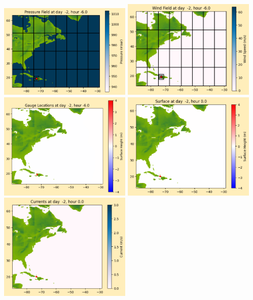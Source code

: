 \documentclass[11pt]{article}
\begin{document}
\includegraphics[width=0.475\textwidth]{frame0003fig1012.png}
\vskip 10pt 
\includegraphics[width=0.475\textwidth]{frame0003fig1013.png}
\includegraphics[width=0.475\textwidth]{frame0003fig1014.png}
\vskip 10pt 
\includegraphics[width=0.475\textwidth]{frame0004fig1001.png}
\includegraphics[width=0.475\textwidth]{frame0004fig1002.png}
\end{document}
